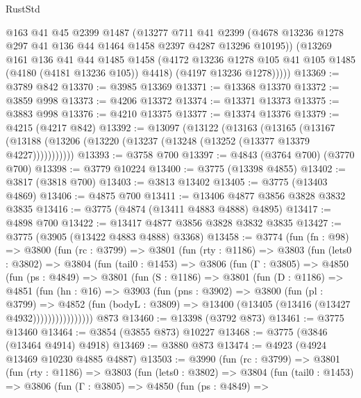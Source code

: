 \begin{lexlean}{RustStd}
\begin{coremodule}
{\begin{coremodule}
{{{{{{{{{{{{{{{{{{{{{{{{{{{{{{{          @163
          @41
          @45
          @2399
          @1487
          (@13277
            @711
            @41
            @2399
            (@4678 @13236 @1278 @297 @41 @136 @44 @1464 @1458 @2397 @4287 @13296 @10195))
          (@13269
            @161
            @136
            @41
            @44
            @1485
            @1458
            (@4172 @13236 @1278 @105 @41 @105 @1485 (@4180 (@4181 @13236 @105)) @4418)
            (@4197 @13236 @1278)))))
@13369 := @3789 @842
@13370 := @3985 @13369
@13371 := @13368 @13370
@13372 := @3859 @998
@13373 := @4206 @13372
@13374 := @13371 @13373
@13375 := @3883 @998
@13376 := @4210 @13375
@13377 := @13374 @13376
@13379 := @4215 (@4217 @842)
@13392 := @13097
    (@13122
      (@13163
        (@13165
          (@13167 (@13188 (@13206 (@13220 (@13237 (@13248 (@13252 (@13377 @13379 @4227)))))))))))
@13393 := @3758 @700
@13397 := @4843 (@3764 @700) (@3770 @700)
@13398 := @3779 @10224
@13400 := @3775 (@13398 @4855)
@13402 := @3817 (@3818 @700)
@13403 := @3813 @13402
@13405 := @3775 (@13403 @4869)
@13406 := @4875 @700
@13411 := @13406 @4877 @3856 @3828 @3832 @3835
@13416 := @3775 (@4874 (@13411 @4883 @4888) @4895)
@13417 := @4898 @700
@13422 := @13417 @4877 @3856 @3828 @3832 @3835
@13427 := @3775 (@3905 (@13422 @4883 @4888) @3368)
@13458 := @3774
    (fun (fn : @98) =>
    @3800
      (fun (rc : @3799) =>
      @3801
        (fun (rty : @1186) =>
        @3803
          (fun (lets0 : @3802) =>
          @3804
            (fun (tail0 : @1453) =>
            @3806
              (fun (Γ : @3805) =>
              @4850
                (fun (ps : @4849) =>
                @3801
                  (fun (S : @1186) =>
                  @3801
                    (fun (D : @1186) =>
                    @4851
                      (fun (hn : @16) =>
                      @3903
                        (fun (pns : @3902) =>
                        @3800
                          (fun (pl : @3799) =>
                          @4852
                            (fun (bodyL : @3809) =>
                            @13400 (@13405 (@13416 (@13427 @4932))))))))))))))))
    @873
@13460 := @13398 (@3792 @873)
@13461 := @3775 @13460
@13464 := @3854 (@3855 @873) @10227
@13468 := @3775 (@3846 (@13464 @4914) @4918)
@13469 := @3880 @873
@13474 := @4923 (@4924 @13469 @10230 @4885 @4887)
@13503 := @3990
    (fun (rc : @3799) =>
    @3801
      (fun (rty : @1186) =>
      @3803
        (fun (lets0 : @3802) =>
        @3804
          (fun (tail0 : @1453) =>
          @3806
            (fun (Γ : @3805) =>
            @4850
              (fun (ps : @4849) =>
}}}}}}}}}}}}}}}}}}}}}}}}}}}}}}}
\end{coremodule}}
\end{coremodule}
\end{lexlean}
